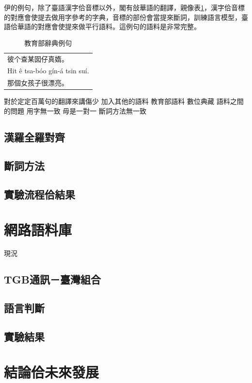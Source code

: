 \documentclass[final,oneside,onecolumn,12pt,a4paper]{book}%
\begin{document}
伊的例句，除了臺語漢字佮音標以外，閣有敆華語的翻譯，親像表\ref{表：教育部辭典例句}，漢字佮音標的對應會使提去做用字參考的字典，音標的部份會當提來斷詞，訓練語言模型，臺語佮華語的對應會使提來做平行語料。這例句的語料是非常完整。
\begin{table}
\caption{教育部辭典例句}
\label{表：教育部辭典例句}
\centering
\begin{tabular}{l}
彼个查某囡仔真媠。 \\
Hit ê tsa-bóo gín-á tsin suí.\\
那個女孩子很漂亮。\\
\end{tabular}
\end{table}

對於定定百萬句的翻譯來講傷少
加入其他的語料
教育部語料
數位典藏
 語料之間的問題
用字無一致
毋是一對一
斷詞方法無一致


\section{漢羅全羅對齊}
\label{節：漢羅全羅對齊}

\section{斷詞方法}
\label{節：斷詞方法}

\section{實驗流程佮結果}
\label{節：實驗流程佮結果}


\chapter{網路語料庫}
\label{章：網路語料庫}
現況
\section{TGB通訊－臺灣組合}
\label{節：TGB通訊－臺灣組合}

\section{語言判斷}
\label{節：語言判斷}

\section{實驗結果}
\label{節：實驗結果}


\chapter{結論佮未來發展}
\label{章：結論佮未來發展}
\end{document}
